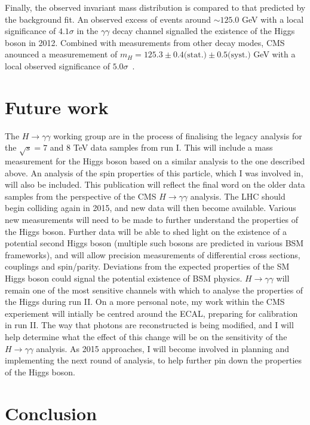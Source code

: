 \documentclass[10pt]{article}
\begin{document}
Finally, the observed invariant mass distribution is compared to that predicted by the background fit. An observed excess of events around $\sim125.0$ GeV with a local significance of $4.1 \sigma$ in the $\gamma \gamma$ decay channel signalled the existence of the Higgs boson in 2012. Combined with measurements from other decay modes, CMS anounced a measuremement of $m_H=125.3 \pm 0.4 \text{(stat.)} \pm 0.5 \text{(syst.)}$ GeV with a local observed significance of $5.0 \sigma$~\cite{HDisc}.


\section{Future work}

The $H \rightarrow \gamma \gamma$ working group are in the process of finalising the legacy analysis for the $\sqrt{s}=7$ and $8$ TeV data samples from run I. This will include a mass measurement for the Higgs boson based on a similar analysis to the one described above. An analysis of the spin properties of this particle, which I was involved in, will also be included. This publication will reflect the final word on the older data samples from the perspective of the CMS $H \rightarrow \gamma \gamma$ analysis. The LHC should begin colliding again in 2015, and new data will then become available. Various new measurements will need to be made to further understand the properties of the Higgs boson. Further data will be able to shed light on the existence of a potential second Higgs boson (multiple such bosons are predicted in various BSM frameworks), and will allow precision measurements of differential cross sections, couplings and spin/parity. Deviations from the expected properties of the SM Higgs boson could signal the potential existence of BSM physics.  $H\rightarrow \gamma \gamma$ will remain one of the most sensitive channels with which to analyse the properties of the Higgs during run II.
On a more personal note, my work within the CMS experiement will intially be centred around the ECAL, preparing for calibration in run II. The way that photons are reconstructed is being modified, and I will help determine what the effect of this change will be on the sensitivity of the $H \rightarrow \gamma \gamma$ analysis. As 2015 approaches, I will become involved in planning and implementing the next round of analysis, to help further pin down the properties of the Higgs boson.

\section{Conclusion}
\end{document}
